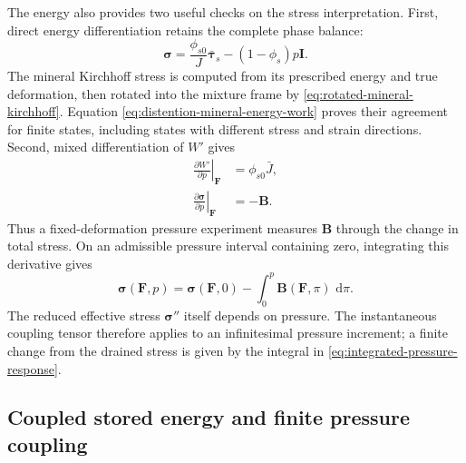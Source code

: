 \documentclass[11pt]{article}
\newcommand{\dd}{\,\mathrm d}
\newcommand{\pder}[2]{\frac{\partial #1}{\partial #2}}
\begin{document}
The energy also provides two useful checks on the stress interpretation.
First, direct energy differentiation retains the complete phase balance:
\begin{equation}
 \mathbf\sigma
 =\frac{\phi_{s0}}J\bar{\mathbf\tau}_s
       -(1-\phi_s)p\mathbf I.
 \label{eq:total-stress-phase-energy}
\end{equation}
The mineral Kirchhoff stress is computed from its prescribed energy and
true deformation, then rotated into the mixture frame by
\eqref{eq:rotated-mineral-kirchhoff}. Equation
\eqref{eq:distention-mineral-energy-work} proves their agreement for finite
states, including states with different stress and strain directions.
Second, mixed differentiation of \(W'\) gives
\begin{align}
 \left.\pder{W'}p\right|_{\mathbf F}&=\phi_{s0}\bar J,
 \label{eq:pressure-envelope}\\
 \left.\pder{\mathbf\sigma}p\right|_{\mathbf F}&=-\mathbf B.
 \label{eq:cauchy-pressure-tangent}
\end{align}
Thus a fixed-deformation pressure experiment measures \(\mathbf B\)
through the change in total stress. On an admissible pressure interval
containing zero, integrating this derivative gives
\begin{equation}
 \mathbf\sigma(\mathbf F,p)
 =\mathbf\sigma(\mathbf F,0)
       -\int_0^p\mathbf B(\mathbf F,\pi)\,\dd\pi.
 \label{eq:integrated-pressure-response}
\end{equation}
The reduced effective stress \(\mathbf\sigma''\) itself depends
on pressure. The instantaneous coupling tensor therefore applies to an
infinitesimal pressure increment; a finite change from the drained stress
is given by the integral in \eqref{eq:integrated-pressure-response}.

\subsection{Coupled stored energy and finite pressure coupling}
\label{sec:coupled-energy-finite-pressure}
\end{document}
